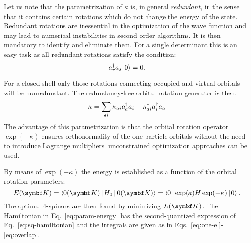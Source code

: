 Let us note that the parametrization of $\kappa$ is, in general
\emph{redundant}, in the sense that it contains certain rotations which
do not change the energy of the state. Redundant rotations are
inessential in the optimization of the wave function and may lead to
numerical instabilities in second order algorithms.\autocite{Helgaker2000-tz,
Shepard1987-sn}
It is then mandatory to identify and eliminate them. For a single
determinant this is an easy task as all redundant rotations satisfy the
condition:
\begin{equation}
 a_{r}^{\dagger}a_{s}\Ket{0} = 0.
\end{equation}

For a closed shell only those rotations connecting occupied and virtual
orbitals will be nonredundant. The redundancy-free orbital rotation
generator is then:
\begin{equation}\label{eq:orb-rot-nonred}
  \kappa = \sum_{ai}\kappa_{ai}a_{a}^{\dagger}a_{i} -\kappa_{ai}^* a_{i}^{\dagger}a_{a}
\end{equation}
The advantage of this parametrization is that the orbital rotation
operator $\exp(-\kappa)$ ensures orthonormality of the one-particle
orbitals without the need to introduce Lagrange multipliers:
unconstrained optimization approaches can be used.

By means of $\exp(-\kappa)$ the energy is established as a function of
the orbital rotation parameters:
\begin{equation}\label{eq:param-energy}
 E(\vect{K}) = \Braket{0(\vect{K})|H_0|0(\vect{K})} = \Braket{0|\exp(\kappa)H\exp(-\kappa)|0}.
\end{equation}
The optimal 4-spinors are then found by minimizing $E(\vect{K})$. The
Hamiltonian in Eq.~\eqref{eq:param-energy} has the second-quantized
expression of Eq.~\eqref{eq:sq-hamiltonian} and the integrals are given as
in Eqs.~\eqref{eq:one-el}-\eqref{eq:overlap}.


